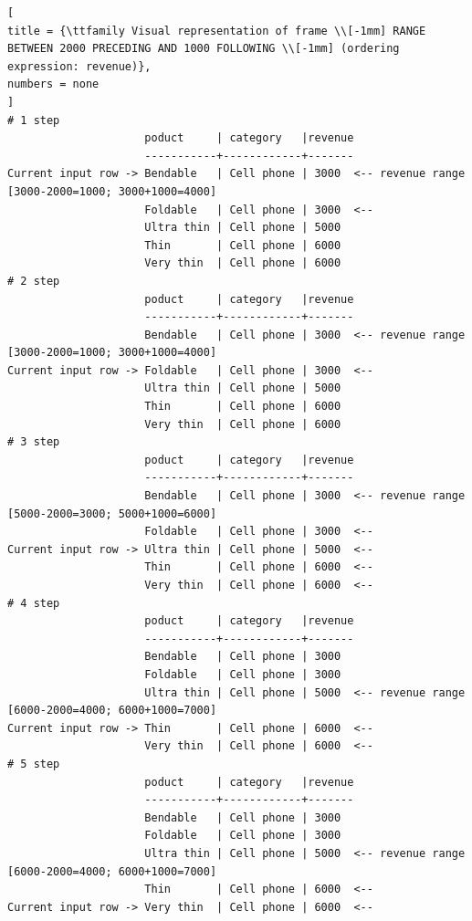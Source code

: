 \documentclass[%
	11pt,
	a4paper,
	utf8,
		]{article}
\begin{document}
\begin{lstlisting}[
title = {\ttfamily Visual representation of frame \\[-1mm] RANGE BETWEEN 2000 PRECEDING AND 1000 FOLLOWING \\[-1mm] (ordering expression: revenue)},
numbers = none
]
# 1 step
                     poduct     | category   |revenue
                     -----------+------------+-------
Current input row -> Bendable   | Cell phone | 3000  <-- revenue range [3000-2000=1000; 3000+1000=4000]
                     Foldable   | Cell phone | 3000  <--
                     Ultra thin | Cell phone | 5000
                     Thin       | Cell phone | 6000
                     Very thin  | Cell phone | 6000
# 2 step
                     poduct     | category   |revenue
                     -----------+------------+-------
                     Bendable   | Cell phone | 3000  <-- revenue range [3000-2000=1000; 3000+1000=4000]
Current input row -> Foldable   | Cell phone | 3000  <--
                     Ultra thin | Cell phone | 5000
                     Thin       | Cell phone | 6000
                     Very thin  | Cell phone | 6000
# 3 step
                     poduct     | category   |revenue
                     -----------+------------+-------
                     Bendable   | Cell phone | 3000  <-- revenue range [5000-2000=3000; 5000+1000=6000]
                     Foldable   | Cell phone | 3000  <--
Current input row -> Ultra thin | Cell phone | 5000  <--
                     Thin       | Cell phone | 6000  <--
                     Very thin  | Cell phone | 6000  <--
# 4 step
                     poduct     | category   |revenue
                     -----------+------------+-------
                     Bendable   | Cell phone | 3000
                     Foldable   | Cell phone | 3000 
                     Ultra thin | Cell phone | 5000  <-- revenue range [6000-2000=4000; 6000+1000=7000]
Current input row -> Thin       | Cell phone | 6000  <--
                     Very thin  | Cell phone | 6000  <--
# 5 step
                     poduct     | category   |revenue
                     -----------+------------+-------
                     Bendable   | Cell phone | 3000
                     Foldable   | Cell phone | 3000 
                     Ultra thin | Cell phone | 5000  <-- revenue range [6000-2000=4000; 6000+1000=7000]
                     Thin       | Cell phone | 6000  <--
Current input row -> Very thin  | Cell phone | 6000  <--
\end{lstlisting}
\end{document}
